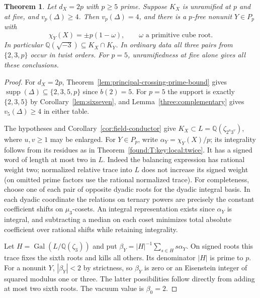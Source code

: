 \documentclass[11pt,a4paper]{article}
\numberwithin{equation}{section}
\newtheorem{theorem}{Theorem}[section]
\theoremstyle{remark}
\newcommand{\Gal}{\operatorname{Gal}}
\newcommand{\QQ}{\mathbb Q}
\begin{document}
\begin{theorem}\label{found:T:3.2}\label{found:T:key:local:ten}
Let $d_X=2p$ with $p\ge5$ prime. Suppose $K_X$ is unramified at
$p$ and at five, and $v_p(\Delta)\ge4$. Then $v_p(\Delta)=4$, and
there is a $p$-free nonunit $Y\in P_p$ with
\[
 \chi_Y(X)=\pm p(1-\omega),\qquad \omega\text{ a primitive cube root}.
\]
In particular $\QQ(\sqrt{-3})\subseteq K_X\cap K_Y$. In ordinary data
all three pairs from $\{2,3,p\}$ occur in twist orders. For $p=5$,
unramifiedness at five alone gives all these conclusions.
\end{theorem}
\begin{proof}
For $d_X=2p$, Theorem~\ref{lem:principal-crossing-prime-bound} gives
$\operatorname{supp}(\Delta)\subseteq\{2,3,5,p\}$ since $b(2)=5$.
For $p=5$ the support is exactly $\{2,3,5\}$ by Corollary~\ref{lem:sixseven},
and Lemma~\ref{three:complementary} gives $v_5(\Delta)\ge4$ in either table.

The hypotheses and Corollary~\ref{cor:field-conductor} give $K_X\subset L=\QQ(\zeta_{2^u3^v})$,
where $u,v\ge1$ may be enlarged. For $Y\in P_p$, write
$\alpha_Y=\chi_Y(X)/p$; its integrality follows from its residues
as in Theorem~\ref{found:T:key:local:twice}. It has a signed word of length
at most two in $L$. Indeed the balancing expression has rational weight
two; normalized relative trace into $L$ does not increase its signed
weight (on omitted prime factors use the rational normalized trace).
For completeness, choose one of each pair of opposite dyadic roots for
the dyadic integral basis. In each dyadic coordinate the relations on
ternary powers are precisely the constant coefficient shifts on
$\mu_3$-cosets. An integral representation exists since $\alpha_Y$
is integral, and subtracting a median on each coset minimizes total
absolute coefficient over rational shifts while retaining integrality.

Let $H=\Gal(L/\QQ(\zeta_3))$ and put
$\beta_Y=|H|^{-1}\sum_{s\in H}s\alpha_Y$. On signed roots this trace
fixes the sixth roots and kills all others. Its denominator $|H|$ is
prime to $p$. For a nonunit $Y$, $|\beta_Y|<2$ by strictness, so
$\beta_Y$ is zero or an Eisenstein integer of squared modulus one or
three. The latter possibilities follow directly from adding at most
two sixth roots. The vacuum value is $\beta_0=2$.


\end{proof}
\end{document}
